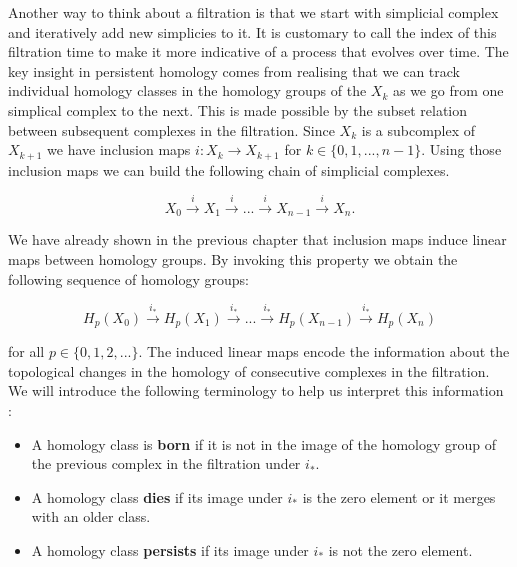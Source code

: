 %

Another way to think about a filtration is that we start with simplicial complex and iteratively add new simplicies to it. It is customary to call the index of this filtration time to make it more indicative of a process that evolves over time. The key insight in persistent homology comes from realising that we can track individual homology classes in the homology groups of the $X_k$ as we go from one simplical complex to the next. This is made possible by the subset relation between subsequent complexes in the filtration. Since $X_k$ is a subcomplex of $X_{k+1}$ we have inclusion maps $i: X_{k} \to X_{k+1}$ for $k \in \{0, 1, ..., n - 1\}$. Using those inclusion maps we can build the following chain of simplicial complexes.

$$ X_0 \overset{i}{\longrightarrow} X_1 \overset{i}{\longrightarrow} ... \overset{i}{\longrightarrow} X_{n-1} \overset{i}{\longrightarrow} X_n .$$

We have already shown in the previous chapter that inclusion maps induce linear maps between homology groups. By invoking this property we obtain the following sequence of homology groups:

$$ H_p(X_0) \overset{i_*}{\longrightarrow} H_p(X_1) \overset{i_*}{\longrightarrow} ... \overset{i_*}{\longrightarrow} H_p(X_{n-1}) \overset{i_*}{\longrightarrow} H_p(X_n) $$

for all $p \in \{0, 1, 2, ...\}$. The induced linear maps encode the information about the topological changes in the homology of consecutive complexes in the filtration. We will introduce the following terminology to help us interpret this information \cite{elementary-applied-topology}:

\begin{itemize}
    \item A homology class is \textbf{born} if it is not in the image of the homology group of the previous complex in the filtration under $i_*$.
    \item A homology class \textbf{dies} if its image under $i_*$ is the zero element or it merges with an older class.
    \item A homology class \textbf{persists} if its image under $i_*$ is not the zero element.
\end{itemize}

